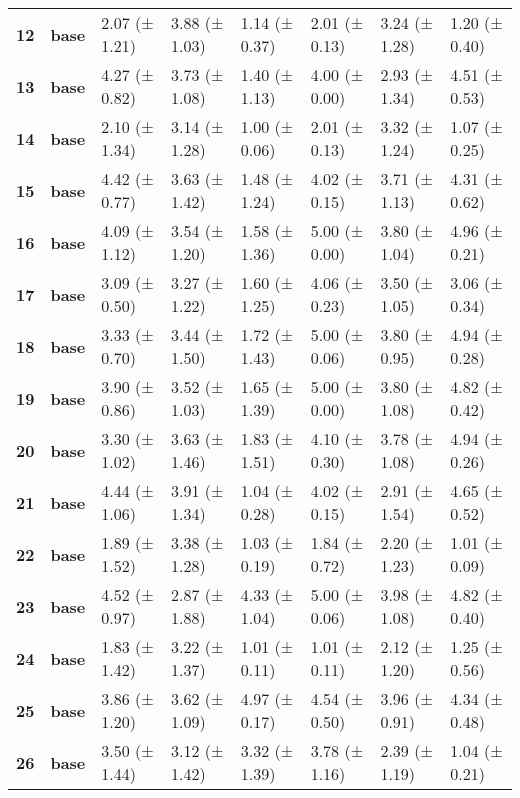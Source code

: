 \begin{longtable}{llllllll}
\cline{1-8}
\textbf{12} & \textbf{base} & 2.07 (± 1.21) & 3.88 (± 1.03) & 1.14 (± 0.37) & 2.01 (± 0.13) & 3.24 (± 1.28) & 1.20 (± 0.40) \\
\cline{1-8}
\textbf{13} & \textbf{base} & 4.27 (± 0.82) & 3.73 (± 1.08) & 1.40 (± 1.13) & 4.00 (± 0.00) & 2.93 (± 1.34) & 4.51 (± 0.53) \\
\cline{1-8}
\textbf{14} & \textbf{base} & 2.10 (± 1.34) & 3.14 (± 1.28) & 1.00 (± 0.06) & 2.01 (± 0.13) & 3.32 (± 1.24) & 1.07 (± 0.25) \\
\cline{1-8}
\textbf{15} & \textbf{base} & 4.42 (± 0.77) & 3.63 (± 1.42) & 1.48 (± 1.24) & 4.02 (± 0.15) & 3.71 (± 1.13) & 4.31 (± 0.62) \\
\cline{1-8}
\textbf{16} & \textbf{base} & 4.09 (± 1.12) & 3.54 (± 1.20) & 1.58 (± 1.36) & 5.00 (± 0.00) & 3.80 (± 1.04) & 4.96 (± 0.21) \\
\cline{1-8}
\textbf{17} & \textbf{base} & 3.09 (± 0.50) & 3.27 (± 1.22) & 1.60 (± 1.25) & 4.06 (± 0.23) & 3.50 (± 1.05) & 3.06 (± 0.34) \\
\cline{1-8}
\textbf{18} & \textbf{base} & 3.33 (± 0.70) & 3.44 (± 1.50) & 1.72 (± 1.43) & 5.00 (± 0.06) & 3.80 (± 0.95) & 4.94 (± 0.28) \\
\cline{1-8}
\textbf{19} & \textbf{base} & 3.90 (± 0.86) & 3.52 (± 1.03) & 1.65 (± 1.39) & 5.00 (± 0.00) & 3.80 (± 1.08) & 4.82 (± 0.42) \\
\cline{1-8}
\textbf{20} & \textbf{base} & 3.30 (± 1.02) & 3.63 (± 1.46) & 1.83 (± 1.51) & 4.10 (± 0.30) & 3.78 (± 1.08) & 4.94 (± 0.26) \\
\cline{1-8}
\textbf{21} & \textbf{base} & 4.44 (± 1.06) & 3.91 (± 1.34) & 1.04 (± 0.28) & 4.02 (± 0.15) & 2.91 (± 1.54) & 4.65 (± 0.52) \\
\cline{1-8}
\textbf{22} & \textbf{base} & 1.89 (± 1.52) & 3.38 (± 1.28) & 1.03 (± 0.19) & 1.84 (± 0.72) & 2.20 (± 1.23) & 1.01 (± 0.09) \\
\cline{1-8}
\textbf{23} & \textbf{base} & 4.52 (± 0.97) & 2.87 (± 1.88) & 4.33 (± 1.04) & 5.00 (± 0.06) & 3.98 (± 1.08) & 4.82 (± 0.40) \\
\cline{1-8}
\textbf{24} & \textbf{base} & 1.83 (± 1.42) & 3.22 (± 1.37) & 1.01 (± 0.11) & 1.01 (± 0.11) & 2.12 (± 1.20) & 1.25 (± 0.56) \\
\cline{1-8}
\textbf{25} & \textbf{base} & 3.86 (± 1.20) & 3.62 (± 1.09) & 4.97 (± 0.17) & 4.54 (± 0.50) & 3.96 (± 0.91) & 4.34 (± 0.48) \\
\cline{1-8}
\textbf{26} & \textbf{base} & 3.50 (± 1.44) & 3.12 (± 1.42) & 3.32 (± 1.39) & 3.78 (± 1.16) & 2.39 (± 1.19) & 1.04 (± 0.21) \\

\end{longtable}
